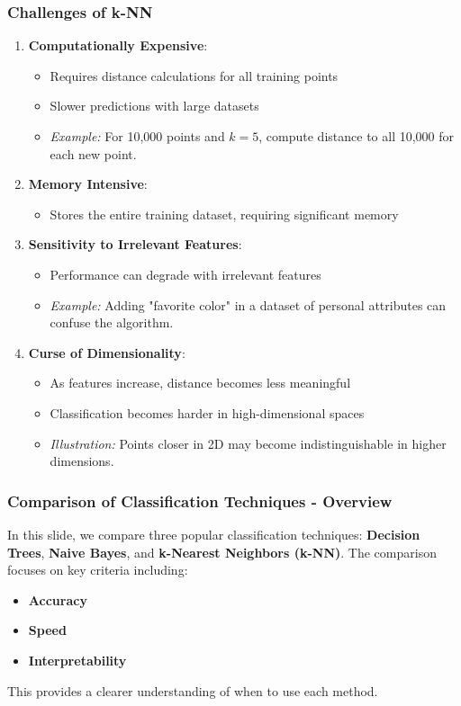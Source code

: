 \documentclass[aspectratio=169]{beamer}
\begin{document}
\begin{frame}[fragile]
  \frametitle{Challenges of k-NN}
  
  \begin{enumerate}
      \item \textbf{Computationally Expensive}:
      \begin{itemize}
          \item Requires distance calculations for all training points
          \item Slower predictions with large datasets
          \item \textit{Example:} For 10,000 points and $k=5$, compute distance to all 10,000 for each new point.
      \end{itemize}
      
      \item \textbf{Memory Intensive}:
      \begin{itemize}
          \item Stores the entire training dataset, requiring significant memory
      \end{itemize}
      
      \item \textbf{Sensitivity to Irrelevant Features}:
      \begin{itemize}
          \item Performance can degrade with irrelevant features
          \item \textit{Example:} Adding "favorite color" in a dataset of personal attributes can confuse the algorithm.
      \end{itemize}
      
      \item \textbf{Curse of Dimensionality}:
      \begin{itemize}
          \item As features increase, distance becomes less meaningful
          \item Classification becomes harder in high-dimensional spaces
          \item \textit{Illustration:} Points closer in 2D may become indistinguishable in higher dimensions.
      \end{itemize}
  \end{enumerate}
\end{frame}

\begin{frame}[fragile]
    \frametitle{Comparison of Classification Techniques - Overview}
    In this slide, we compare three popular classification techniques: 
    \textbf{Decision Trees}, \textbf{Naive Bayes}, and \textbf{k-Nearest Neighbors (k-NN)}. 
    The comparison focuses on key criteria including:
    \begin{itemize}
        \item \textbf{Accuracy}
        \item \textbf{Speed}
        \item \textbf{Interpretability}
    \end{itemize}
    This provides a clearer understanding of when to use each method.
\end{frame}
\end{document}
